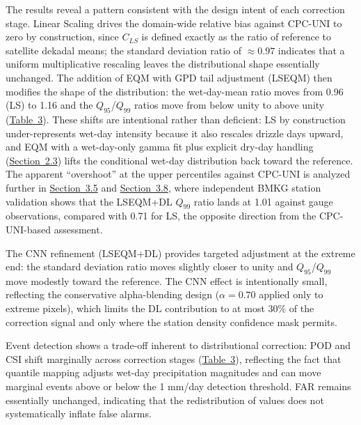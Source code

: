 \documentclass[11pt,a4paper]{article}
\begin{document}
The results reveal a pattern consistent with the design intent of each
correction stage. Linear Scaling drives the domain-wide relative bias
against CPC-UNI to zero by construction, since \(C_{LS}\) is defined
exactly as the ratio of reference to satellite dekadal means; the
standard deviation ratio of \(\approx 0.97\) indicates that a uniform
multiplicative rescaling leaves the distributional shape essentially
unchanged. The addition of EQM with GPD tail adjustment (LSEQM) then
modifies the shape of the distribution: the wet-day-mean ratio moves
from 0.96 (LS) to 1.16 and the \(Q_{95}\)/\(Q_{99}\) ratios move from
below unity to above unity (\hyperref[tab:3]{Table~3}). These shifts are intentional
rather than deficient: LS by construction under-represents wet-day
intensity because it also rescales drizzle days upward, and EQM with a
wet-day-only gamma fit plus explicit dry-day handling (\hyperref[hybrid-bias-correction-methodology]{Section~2.3})
lifts the conditional wet-day distribution back toward the reference.
The apparent ``overshoot'' at the upper percentiles against CPC-UNI is
analyzed further in \hyperref[station-level-ground-truth-validation]{Section~3.5} and \hyperref[discussion]{Section~3.8}, where independent BMKG
station validation shows that the LSEQM+DL \(Q_{99}\) ratio lands at
1.01 against gauge observations, compared with 0.71 for LS, the
opposite direction from the CPC-UNI-based assessment.

The CNN refinement (LSEQM+DL) provides targeted adjustment at the
extreme end: the standard deviation ratio moves slightly closer to unity
and \(Q_{95}\)/\(Q_{99}\) move modestly toward the reference. The CNN
effect is intentionally small, reflecting the conservative
alpha-blending design (\(\alpha = 0.70\) applied only to extreme
pixels), which limits the DL contribution to at most 30\% of the
correction signal and only where the station density confidence mask
permits.

Event detection shows a trade-off inherent to distributional correction:
POD and CSI shift marginally across correction stages (\hyperref[tab:3]{Table~3}),
reflecting the fact that quantile mapping adjusts wet-day precipitation
magnitudes and can move marginal events above or below the 1 mm/day
detection threshold. FAR remains essentially unchanged, indicating that
the redistribution of values does not systematically inflate false
alarms.
\end{document}
